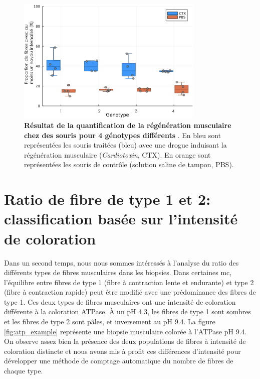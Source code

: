 \begin{figure}[htbp]
 \centering
 \includegraphics[width=0.8\textwidth]{figures/fluo_compil.png}
 \caption[Résultat de la quantification de la régénération musculaire]{\textbf{Résultat de la quantification de la régénération musculaire chez des souris pour 4 génotypes différents }. En bleu sont représentées les souris traitées (bleu) avec une drogue induisant la régénération musculaire (\textit{Cardiotoxin}, CTX). En orange sont représentées les souris de contrôle (solution saline de tampon, PBS).}
 \label{fig:fluo_compil}
\end{figure}

\section{Ratio de fibre de type 1 et 2: classification basée sur l'intensité de coloration}
Dans un second temps, nous nous sommes intéressés à l'analyse du ratio des différents types de fibres musculaires dans les biopsies. Dans certaines \gls{mc}, l'équilibre entre fibres de type 1 (fibre à contraction lente et endurante) et type 2 (fibre à contraction rapide) peut être modifié avec une prédominance des fibres de type 1. Ces deux types de fibres musculaires ont une intensité de coloration différente à la coloration ATPase. À un pH 4.3, les fibres de type 1 sont sombres et les fibres de type 2 sont pâles, et inversement au pH 9.4. La figure \ref{fig:atp_example} représente une biopsie musculaire colorée à l'ATPase pH 9.4. On observe assez bien la présence des deux populations de fibres à intensité de coloration distincte et nous avons mis à profit ces différences d'intensité pour développer une méthode de comptage automatique du nombre de fibres de chaque type.

